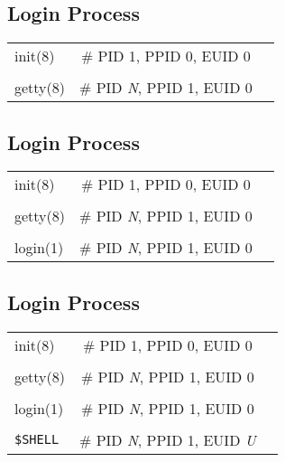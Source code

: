 \documentclass[xga]{xdvislides}
\begin{document}
\subsection{Login Process}
\vspace*{\fill}
\begin{center}
\begin{tabular}[width=.75\texwidth]{l c l}
init(8) & \# PID 1, PPID 0, EUID 0\\
\\
getty(8) & \# PID {\em N}, PPID 1, EUID 0\\
\end{tabular}
\vspace*{\fill}
\end{center}

\subsection{Login Process}
\vspace*{\fill}
\begin{center}
\begin{tabular}[width=.75\texwidth]{l c l}
init(8) & \# PID 1, PPID 0, EUID 0\\
\\
getty(8) & \# PID {\em N}, PPID 1, EUID 0\\
\\
login(1) & \# PID {\em N}, PPID 1, EUID 0\\
\end{tabular}
\vspace*{\fill}
\end{center}

\subsection{Login Process}
\vspace*{\fill}
\begin{center}
\begin{tabular}[width=.75\texwidth]{l c l}
init(8) & \# PID 1, PPID 0, EUID 0\\
\\
getty(8) & \# PID {\em N}, PPID 1, EUID 0\\
\\
login(1) & \# PID {\em N}, PPID 1, EUID 0\\
\\
\verb+$SHELL+ & \# PID {\em N}, PPID 1, EUID {\em U}\\
\end{tabular}
\vspace*{\fill}
\end{center}
\end{document}
